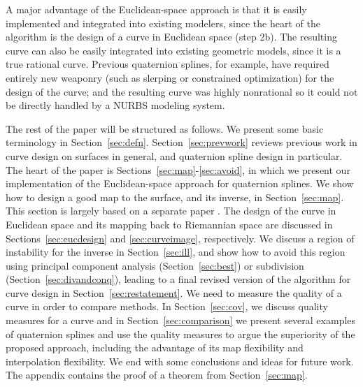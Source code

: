 A major advantage of the Euclidean-space approach is that it is easily
implemented and integrated into existing modelers,
since the heart of the algorithm is the design
of a curve in Euclidean space (step 2b).
The resulting curve can also be easily integrated into existing
geometric models, since it is a true rational curve.
Previous quaternion splines, for example, have required entirely new
weaponry (such as slerping or constrained optimization)
for the design of the curve;
and the resulting curve was highly nonrational so it could not be
directly handled by a NURBS modeling system.

The rest of the paper will be structured as follows.
We present some basic terminology in Section~\ref{sec:defn}.
Section~\ref{sec:prevwork} reviews previous work in curve design on surfaces
in general, and quaternion spline design in particular.
The heart of the paper is Sections~\ref{sec:map}-\ref{sec:avoid},
in which we present our implementation of the Euclidean-space approach
for quaternion splines.
We show how to design a good map to the surface, and its inverse,
in Section~\ref{sec:map}.
This section is largely based on a separate paper \cite{jj98a}.
The design of the curve in Euclidean space and its mapping back 
to Riemannian space are discussed in Sections~\ref{sec:eucdesign} and
\ref{sec:curveimage}, respectively.
We discuss a region of instability for the inverse in Section~\ref{sec:ill},
and show how to avoid this region using principal component analysis 
(Section~\ref{sec:best}) or subdivision (Section~\ref{sec:divandconq}),
leading to a final revised version of the 
algorithm for curve design in Section~\ref{sec:restatement}.
We need to measure the quality of a curve in order to compare methods.
In Section~\ref{sec:cov}, we discuss quality measures for a curve
and in Section~\ref{sec:comparison} we present several examples
of quaternion splines and use the quality measures
to argue the superiority of the proposed approach, including
the advantage of its map flexibility and interpolation flexibility.
We end with some conclusions and ideas for future work.
The appendix contains the proof of a theorem from Section~\ref{sec:map}.

%


